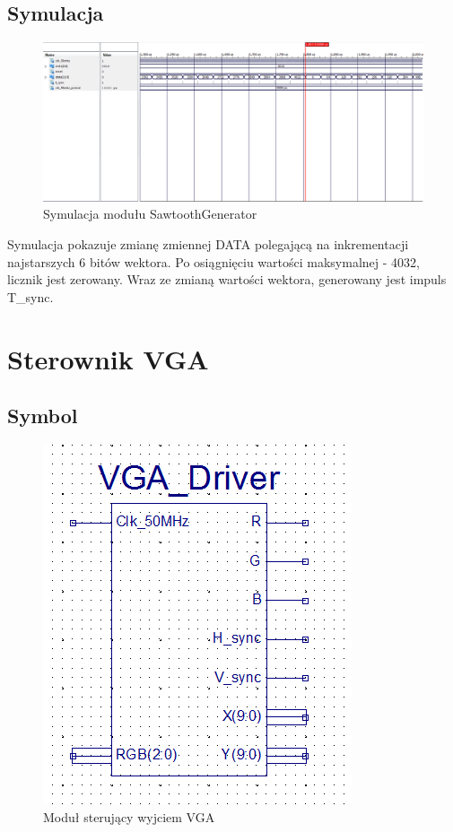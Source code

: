\documentclass[a4paper]{report}
\begin{document}
		\begin{landscape}
			\subsection{Symulacja}
				\begin{figure}[h!]
					\centering
					\includegraphics[width=1.6\textwidth]{sawtooth_generator_symulacja2.png}
					\caption{Symulacja modułu SawtoothGenerator}
				\end{figure}
\justify Symulacja pokazuje zmianę zmiennej DATA polegającą na inkrementacji najstarszych 6 bitów wektora. Po osiągnięciu wartości maksymalnej - 4032,\\ licznik jest zerowany. Wraz ze zmianą wartości wektora, generowany jest impuls T\_sync.
		\end{landscape}
		
		\newpage
	\section{Sterownik VGA}
		\subsection{Symbol}
			\begin{figure}[h!]
				\centering
				\includegraphics{vgadriver2.png}
				\caption{Moduł sterujący wyjciem VGA}
			\end{figure}
\end{document}
